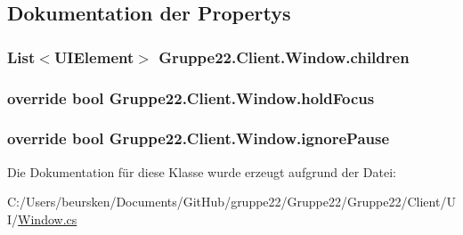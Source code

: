 \subsection{Dokumentation der Propertys}
\hypertarget{class_gruppe22_1_1_client_1_1_window_a8480b3645d012595c617cf1a39ad5a72}{
\subsubsection[{children}]{\setlength{\rightskip}{0pt plus 5cm}List$<${\bf U\-I\-Element}$>$ Gruppe22.\-Client.\-Window.\-children\hspace{0.3cm}{\ttfamily [get]}}}\label{class_gruppe22_1_1_client_1_1_window_a8480b3645d012595c617cf1a39ad5a72}
\hypertarget{class_gruppe22_1_1_client_1_1_window_ab198ef577055a03ab657cefc633999a3}{
\subsubsection[{hold\-Focus}]{\setlength{\rightskip}{0pt plus 5cm}override bool Gruppe22.\-Client.\-Window.\-hold\-Focus\hspace{0.3cm}{\ttfamily [get]}}}\label{class_gruppe22_1_1_client_1_1_window_ab198ef577055a03ab657cefc633999a3}
\hypertarget{class_gruppe22_1_1_client_1_1_window_aed543c8546dcd049df9ef4e2742af0bd}{
\subsubsection[{ignore\-Pause}]{\setlength{\rightskip}{0pt plus 5cm}override bool Gruppe22.\-Client.\-Window.\-ignore\-Pause\hspace{0.3cm}{\ttfamily [get]}}}\label{class_gruppe22_1_1_client_1_1_window_aed543c8546dcd049df9ef4e2742af0bd}


Die Dokumentation für diese Klasse wurde erzeugt aufgrund der Datei\-:\begin{DoxyCompactItemize}
\item 
C\-:/\-Users/beursken/\-Documents/\-Git\-Hub/gruppe22/\-Gruppe22/\-Gruppe22/\-Client/\-U\-I/\hyperlink{_window_8cs}{Window.\-cs}\end{DoxyCompactItemize}
